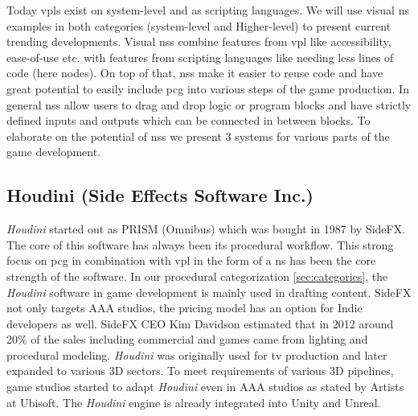 \documentclass[10pt,a4paper]{article}
\begin{document}
\begin{multicols}{2}
Today \gls{vpl}s exist on system-level and as scripting languages. We will use visual \gls{ns} examples in both categories (system-level and Higher-level) to present current trending developments. Visual \gls{ns}s combine features from \gls{vpl} like accessibility, ease-of-use etc. with features from scripting languages like needing less lines of code (here nodes). On top of that, \gls{ns}s make it easier to reuse code and have great potential to easily include \gls{pcg} into various steps of the game production. In general \gls{ns}s allow users to drag and drop logic or program blocks and have strictly defined inputs and outputs which can be connected in between blocks. To elaborate on the potential of \gls{ns}s we present 3 systems for various parts of the game development.\end{multicols}
\subsection{Houdini (Side Effects Software Inc.)}
\begin{multicols}{2}
\textit{Houdini} started out as PRISM (Omnibus) which was bought in 1987 by SideFX. The core of this software has always been its procedural workflow. This strong focus on \gls{pcg} in combination with \gls{vpl} in the form of a \gls{ns} has been the core strength of the software\cite{Seymour2012}. In our procedural categorization \autoref{sec:categories}, the \textit{Houdini} software in game development is mainly used in drafting content. SideFX not only targets AAA studios, the pricing model has an option for Indie developers as well. SideFX CEO Kim Davidson estimated that in 2012 around 20\% of the sales including commercial and games came from lighting and procedural modeling. \textit{Houdini} was originally used for tv production and later expanded to various 3D sectors. To meet requirements of various 3D pipelines, game studios started to adapt \textit{Houdini} even in AAA studios as stated by Artists at Ubisoft\cite{Carrier2018}. The \textit{Houdini} engine is already integrated into Unity and Unreal\cite{SideFXGamesupport}.\end{multicols}
\newpage
\end{document}
